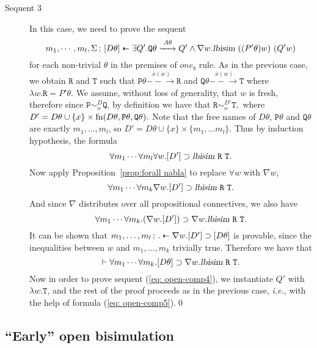 \documentclass{acmtrans2m}
\newcommand{\ie}{{\em i.e.}}
\def\Ppi{{\mathtt P}}
\def\Qpi{{\mathtt Q}}
\def\Rpi{{\mathtt R}}
\def\Tpi{{\mathtt T}}
\def\relbar{\mathrel{\smash-}}
\def\joinrelm{\mathrel{\mkern-3.2mu}}
\def\tailpiece{\kern 1pt\vrule height 1ex width 0.3ex depth -.25ex}
\def\seqsym{\mathrel{\tailpiece\joinrelm\relbar}}
\newcommand{\NSeq}[3]{#1\,;\,#2 \seqsym #3}
\newcommand{\lbisim}[2]{\hbox{\sl lbisim}~#1~#2}
\newcommand{\oimp}{\supset}
\newcommand{\one  }[3]{#1\stackrel{#2}{-\!\!-\!\!\!\rightarrow    } #3}
\newcommand{\fn}[1]{{\rm fn}(#1)}
\begin{document}
\begin{description}
\item[Sequent 3] In this case, we need to prove the sequent
\begin{equation}
\label{eq: open-comp4}
\NSeq{m_1, \cdots, m_l, \Sigma}{[D\theta]}{\exists Q'. \one{\Qpi\theta}{A\theta}{Q'}
\land \nabla w. \lbisim{((P'\theta) w)}{(Q' w)}}
\end{equation}
for each non-trivial $\theta$ in the premises of $one_b$ rule. As in the previous case, we obtain
$\Rpi$ and $\Tpi$ such that
$\one{\Ppi \theta}{\bar x(w)}{\Rpi}$ and $\one{\Qpi \theta}{\bar x(w)}{\Tpi}$
where $\lambda w.\Rpi = P'\theta.$ We assume, without loss of generality, that $w$ is fresh, therefore
since $\Ppi \sim_o^{D} \Qpi$, by definition we have that $\Rpi \sim_o^{D'} \Tpi,$
where $D' = D\theta \cup \{x\}  \times \fn{D\theta, \Ppi\theta, \Qpi\theta}.$
Note that the free names of $D\theta$, $\Ppi\theta$ and $\Qpi\theta$ are exactly
$m_1, \ldots, m_l$, so $D' = D\theta \cup \{x\} \times \{m_1, \ldots m_l\}.$
Thus by induction hypothesis, the formula
$$
\forall m_1 \cdots \forall m_l \forall w. [D'] \oimp \lbisim{\Rpi}{\Tpi}.
$$
Now apply Proposition~\ref{prop:forall nabla} to replace $\forall w$ with $\nabla w$,
$$
\forall m_1 \cdots \forall m_k \nabla w. [D'] \oimp \lbisim{\Rpi}{\Tpi}.
$$
And since $\nabla$ distributes over all propositional connectives, we also have
$$
\forall m_1 \cdots \forall m_k.  (\nabla w.[D']) \oimp \nabla w. \lbisim{\Rpi}{\Tpi}.
$$
It can be shown that $\NSeq{m_1,\ldots, m_l}{.}{\nabla w.[D'] \oimp [D\theta]}$ is provable, 
since the inequalities between $w$ and $m_1, \ldots, m_k$ trivially true. 
Therefore we have that
\begin{equation}
\label{eq: open-comp5}
\vdash \forall m_1 \cdots \forall m_k.  [D\theta] \oimp \nabla w. \lbisim{\Rpi}{\Tpi}.
\end{equation}
Now in order to prove sequent (\ref{eq: open-comp4}), we instantiate
$Q'$ with $\lambda w.\Tpi$, and the rest of the proof proceeds as in the previous case,
\ie, with the help of formula (\ref{eq: open-comp5}).\qed
\end{description}


\subsection{ ``Early'' open bisimulation}
\end{document}

